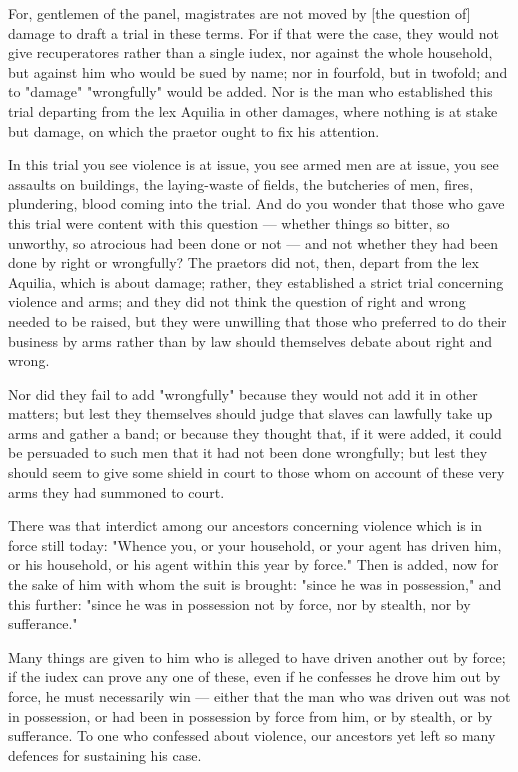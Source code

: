  For, gentlemen of the panel, magistrates are not moved by [the question of] damage to draft a trial in these terms. For if that were the case, they would not give recuperatores rather than a single iudex, nor against the whole household, but against him who would be sued by name; nor in fourfold, but in twofold; and to "damage" "wrongfully" would be added. Nor is the man who established this trial departing from the lex Aquilia in other damages, where nothing is at stake but damage, on which the praetor ought to fix his attention.

 In this trial you see violence is at issue, you see armed men are at issue, you see assaults on buildings, the laying-waste of fields, the butcheries of men, fires, plundering, blood coming into the trial. And do you wonder that those who gave this trial were content with this question --- whether things so bitter, so unworthy, so atrocious had been done or not --- and not whether they had been done by right or wrongfully? The praetors did not, then, depart from the lex Aquilia, which is about damage; rather, they established a strict trial concerning violence and arms; and they did not think the question of right and wrong needed to be raised, but they were unwilling that those who preferred to do their business by arms rather than by law should themselves debate about right and wrong.

 Nor did they fail to add "wrongfully" because they would not add it in other matters; but lest they themselves should judge that slaves can lawfully take up arms and gather a band; or because they thought that, if it were added, it could be persuaded to such men that it had not been done wrongfully; but lest they should seem to give some shield in court to those whom on account of these very arms they had summoned to court.

 There was that interdict among our ancestors concerning violence which is in force still today: "Whence you, or your household, or your agent has driven him, or his household, or his agent within this year by force." Then is added, now for the sake of him with whom the suit is brought: "since he was in possession," and this further: "since he was in possession not by force, nor by stealth, nor by sufferance."

 Many things are given to him who is alleged to have driven another out by force; if the iudex can prove any one of these, even if he confesses he drove him out by force, he must necessarily win --- either that the man who was driven out was not in possession, or had been in possession by force from him, or by stealth, or by sufferance. To one who confessed about violence, our ancestors yet left so many defences for sustaining his case.


